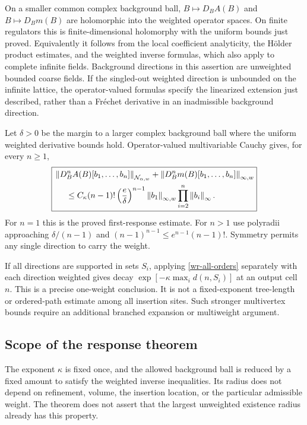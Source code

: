 \documentclass[11pt]{article}
\theoremstyle{remark}
\newcommand{\norm}[1]{\left\|#1\right\|}
\begin{document}
On a smaller common complex background ball,
$B\mapsto D_BA(B)$ and $B\mapsto D_Bm(B)$ are holomorphic
into the weighted operator spaces. On finite regulators this is
finite-dimensional holomorphy with the uniform bounds just
proved. Equivalently it follows from the local coefficient
analyticity, the H\"older product estimates, and the weighted
inverse formulas, which also apply to complete infinite fields.
Background directions in this assertion are unweighted bounded
coarse fields. If the singled-out weighted direction is unbounded
on the infinite lattice, the operator-valued formulas specify the
linearized extension just described, rather than a Fr\'echet
derivative in an inadmissible background direction.

Let $\delta>0$ be the margin to a larger complex background ball
where the uniform weighted derivative bounds hold. Operator-valued
multivariable Cauchy gives, for every $n\ge1$,
\begin{equation}\label{wr-all-orders}
 \boxed{\begin{split}
 &\norm{D_B^n A(B)[b_1,\ldots,b_n]}_{\mathcal N_{\alpha,w}}
       +\norm{D_B^n m(B)[b_1,\ldots,b_n]}_{\infty,w}\\
 &\hspace{5mm}\le C_\kappa(n-1)!
       \left(\frac e\delta\right)^{n-1}
        \norm{b_1}_{\infty,w}\prod_{i=2}^n\norm{b_i}_\infty.
 \end{split}}
\end{equation}
For $n=1$ this is the proved first-response estimate. For $n>1$
use polyradii approaching $\delta/(n-1)$ and
$(n-1)^{n-1}\le e^{n-1}(n-1)!$. Symmetry permits any single
direction to carry the weight.

If all directions are supported in sets $S_i$, applying
\eqref{wr-all-orders} separately with each direction weighted
gives decay $\exp[-\kappa\max_i d(n,S_i)]$ at an output cell
$n$. This is a precise one-weight conclusion. It is not a
fixed-exponent tree-length or ordered-path estimate among all
insertion sites. Such stronger multivertex bounds require an
additional branched expansion or multiweight argument.

\subsection{Scope of the response theorem}
\label{wr-scope}

The exponent $\kappa$ is fixed once, and the allowed background
ball is reduced by a fixed amount to satisfy the weighted
inverse inequalities. Its radius does not depend on refinement,
volume, the insertion location, or the particular admissible
weight. The theorem does not assert that the largest unweighted
existence radius already has this property.
\end{document}
